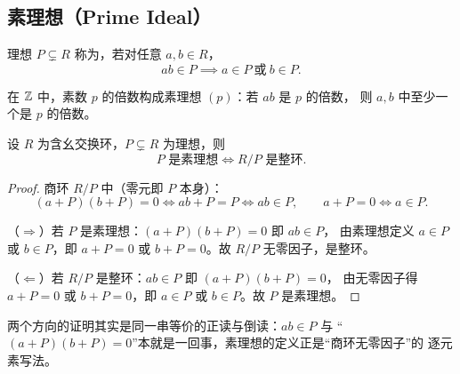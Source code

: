 \subsection{素理想（Prime Ideal）}

\begin{definition}[素理想]
理想 $P\subsetneq R$ 称为，若对任意 $a,b\in R$，
\[
  ab\in P \implies a\in P\ \text{或}\ b\in P.
\]
\end{definition}

\begin{example}
在 $\mathbb{Z}$ 中，素数 $p$ 的倍数构成素理想 $(p)$：若 $ab$ 是 $p$ 的倍数，
则 $a, b$ 中至少一个是 $p$ 的倍数。
\end{example}

\begin{theorem}[素理想的刻画]
设 $R$ 为含幺交换环，$P\subsetneq R$ 为理想，则
\[
  P\text{ 是素理想} \iff R/P\text{ 是整环}.
\]
\end{theorem}

\begin{proof}
商环 $R/P$ 中（零元即 $P$ 本身）：
\[
  (a + P)(b + P) = 0 \iff ab + P = P \iff ab\in P, \qquad
  a + P = 0 \iff a\in P.
\]

（$\Rightarrow$）若 $P$ 是素理想：$(a+P)(b+P) = 0$ 即 $ab\in P$，
由素理想定义 $a\in P$ 或 $b\in P$，即 $a+P = 0$ 或 $b+P = 0$。故 $R/P$
无零因子，是整环。

（$\Leftarrow$）若 $R/P$ 是整环：$ab\in P$ 即 $(a+P)(b+P) = 0$，
由无零因子得 $a+P = 0$ 或 $b+P = 0$，即 $a\in P$ 或 $b\in P$。故 $P$
是素理想。
\end{proof}

\begin{remark}
两个方向的证明其实是同一串等价的正读与倒读：$ab\in P$ 与
“$(a+P)(b+P)=0$”本就是一回事，素理想的定义正是“商环无零因子”的
逐元素写法。
\end{remark}
